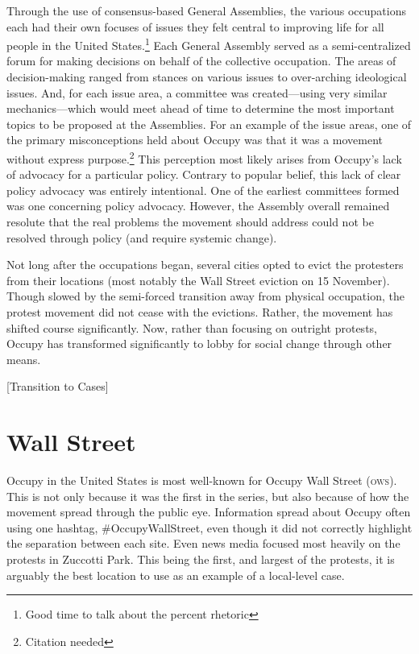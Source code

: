 \documentclass{article}
\begin{document}
Through the use of consensus-based General Assemblies, the various occupations each had their own focuses of issues they felt central to improving life for all people in the United States.\footnote{Good time to talk about the  percent rhetoric}
Each General Assembly served as a semi-centralized forum for making decisions on behalf of the collective occupation.
The areas of decision-making ranged from stances on various issues to over-arching ideological issues.
And, for each issue area, a committee was created---using very similar mechanics---which would meet ahead of time to determine the most important topics to be proposed at the Assemblies.
For an example of the issue areas, one of the primary misconceptions held about Occupy was that it was a movement without express purpose.\footnote{Citation needed}
This perception most likely arises from Occupy's lack of advocacy for a particular policy.
Contrary to popular belief, this lack of clear policy advocacy was entirely intentional.
One of the earliest committees formed was one concerning policy advocacy.
However, the Assembly overall remained resolute that the real problems the movement should address could not be resolved through policy (and require systemic change).

Not long after the occupations began, several cities opted to evict the protesters from their locations (most notably the Wall Street eviction on 15 November).
Though slowed by the semi-forced transition away from physical occupation, the protest movement did not cease with the evictions.
Rather, the movement has shifted course significantly.
Now, rather than focusing on outright protests, Occupy has transformed significantly to lobby for social change through other means.

[Transition to Cases]

\section{Wall Street}
Occupy in the United States is most well-known for Occupy Wall Street (\textsc{ows}).
This is not only because it was the first in the series, but also because of how the movement spread through the public eye.
Information spread about Occupy often using one hashtag, \#OccupyWallStreet, even though it did not correctly highlight the separation between each site.
Even news media focused most heavily on the protests in Zuccotti Park.
This being the first, and largest of the protests, it is arguably the best location to use as an example of a local-level case.
\end{document}
